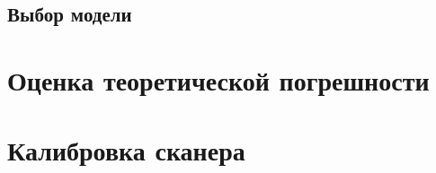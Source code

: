         \subsection{Выбор модели}

    \section{Оценка теоретической погрешности}\label{sec:error}
    
    \section{Калибровка сканера}